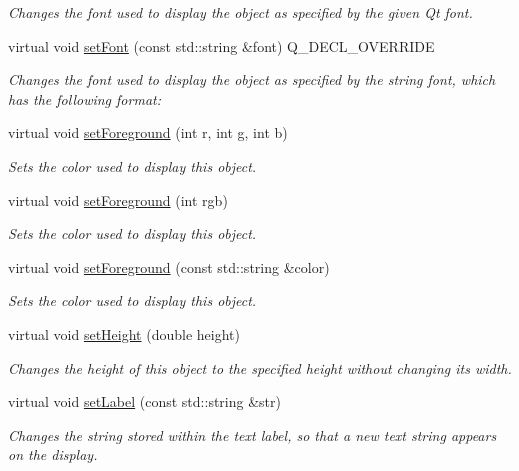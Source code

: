 \begin{DoxyCompactItemize}
\begin{DoxyCompactList}\small\item\em Changes the font used to display the object as specified by the given Qt font. \end{DoxyCompactList}\item 
virtual void \mbox{\hyperlink{classGText_ab39ef411fb13a52852ddd138c5932e2e}{set\+Font}} (const std\+::string \&font) Q\+\_\+\+D\+E\+C\+L\+\_\+\+O\+V\+E\+R\+R\+I\+DE
\begin{DoxyCompactList}\small\item\em Changes the font used to display the object as specified by the string {\ttfamily font}, which has the following format\+: \end{DoxyCompactList}\item 
virtual void \mbox{\hyperlink{classGObject_ad18e8fab1e02a4e9b75c6730212558eb}{set\+Foreground}} (int r, int g, int b)
\begin{DoxyCompactList}\small\item\em Sets the color used to display this object. \end{DoxyCompactList}\item 
virtual void \mbox{\hyperlink{classGObject_a9eb856b5ff83a19df3831a31f15f4563}{set\+Foreground}} (int rgb)
\begin{DoxyCompactList}\small\item\em Sets the color used to display this object. \end{DoxyCompactList}\item 
virtual void \mbox{\hyperlink{classGObject_af59209aeadea6dfc6d97a2d8531f50e1}{set\+Foreground}} (const std\+::string \&color)
\begin{DoxyCompactList}\small\item\em Sets the color used to display this object. \end{DoxyCompactList}\item 
virtual void \mbox{\hyperlink{classGObject_a9e280bfc4544dfaf8e4376c4e1a74357}{set\+Height}} (double height)
\begin{DoxyCompactList}\small\item\em Changes the height of this object to the specified height without changing its width. \end{DoxyCompactList}\item 
virtual void \mbox{\hyperlink{classGText_a889d82f199797fea605ee8230dcd4f6f}{set\+Label}} (const std\+::string \&str)
\begin{DoxyCompactList}\small\item\em Changes the string stored within the text label, so that a new text string appears on the display. \end{DoxyCompactList}\item 

\end{DoxyCompactItemize}
